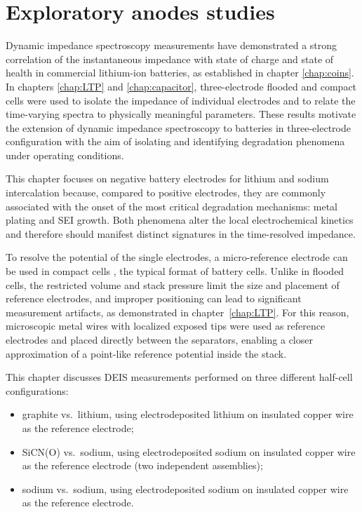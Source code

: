 \chapter{Exploratory anodes studies}
\label{chap:anodes}

Dynamic impedance spectroscopy measurements have demonstrated a strong correlation of the instantaneous impedance with state of charge and state of health in commercial lithium-ion batteries, as established in chapter \ref{chap:coins}.  
In chapters \ref{chap:LTP} and \ref{chap:capacitor}, three-electrode flooded and compact cells were used to isolate the impedance of individual electrodes and to relate the time-varying spectra to physically meaningful parameters.
These results motivate the extension of dynamic impedance spectroscopy to batteries in three-electrode configuration with the aim of isolating and identifying degradation phenomena under operating conditions.
  
This chapter focuses on negative battery electrodes for lithium and sodium intercalation because, compared to positive electrodes, they are commonly associated with the onset of the most critical degradation mechanisms: metal plating and SEI growth.  
Both phenomena alter the local electrochemical kinetics and therefore should manifest distinct signatures in the time-resolved impedance.  

To resolve the potential of the single electrodes, a micro-reference electrode can be used in compact cells \cite{raccichiniCriticalReviewReference2019}, the typical format of battery cells.
Unlike in flooded cells, the restricted volume and stack pressure limit the size and placement of reference electrodes, and improper positioning can lead to significant measurement artifacts, as demonstrated in chapter~\ref{chap:LTP}.  
For this reason, microscopic metal wires with localized exposed tips were used as reference electrodes and placed directly between the separators, enabling a closer approximation of a point-like reference potential inside the stack.


This chapter discusses DEIS measurements performed on three different half-cell configurations:
\begin{itemize}
    \item graphite vs.\ lithium, using electrodeposited lithium on insulated copper wire as the reference electrode;
    \item SiCN(O) vs.\ sodium, using electrodeposited sodium on insulated copper wire as the reference electrode (two independent assemblies);
    \item sodium vs.\ sodium, using electrodeposited sodium on insulated copper wire as the reference electrode.
\end{itemize}


